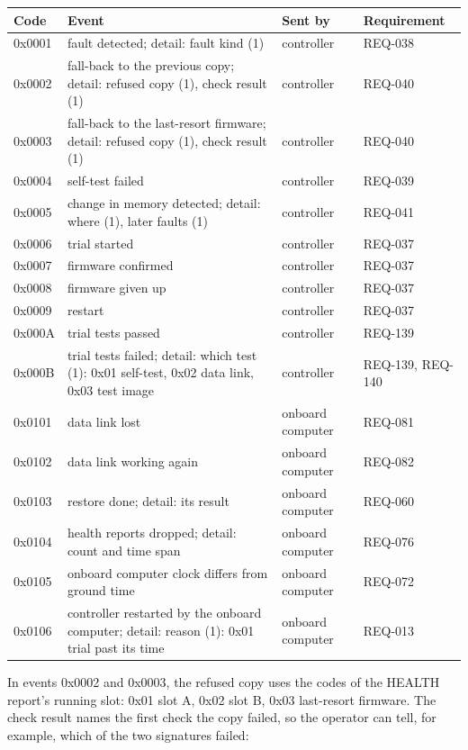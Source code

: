 \documentclass[11pt,a4paper]{article}
\begin{document}
{\footnotesize\noindent\begin{tabularx}{\textwidth}{@{}l>{\raggedright\arraybackslash}Xll@{}}
\toprule
Code & Event & Sent by & Requirement \\
\midrule
0x0001 & fault detected; detail: fault kind (1) & controller & REQ-038 \\
0x0002 & fall-back to the previous copy; detail: refused copy (1), check result (1) & controller & REQ-040 \\
0x0003 & fall-back to the last-resort firmware; detail: refused copy (1), check result (1) & controller & REQ-040 \\
0x0004 & self-test failed & controller & REQ-039 \\
0x0005 & change in memory detected; detail: where (1), later faults (1) & controller & REQ-041 \\
0x0006 & trial started & controller & REQ-037 \\
0x0007 & firmware confirmed & controller & REQ-037 \\
0x0008 & firmware given up & controller & REQ-037 \\
0x0009 & restart & controller & REQ-037 \\
0x000A & trial tests passed & controller & REQ-139 \\
0x000B & trial tests failed; detail: which test (1): 0x01 self-test, 0x02 data link, 0x03 test image & controller & REQ-139, REQ-140 \\
0x0101 & data link lost & onboard computer & REQ-081 \\
0x0102 & data link working again & onboard computer & REQ-082 \\
0x0103 & restore done; detail: its result & onboard computer & REQ-060 \\
0x0104 & health reports dropped; detail: count and time span & onboard computer & REQ-076 \\
0x0105 & onboard computer clock differs from ground time & onboard computer & REQ-072 \\
0x0106 & controller restarted by the onboard computer; detail: reason (1): 0x01 trial past its time & onboard computer & REQ-013 \\
\bottomrule
\end{tabularx}}

\medskip
\noindent In events 0x0002 and 0x0003, the refused copy uses the codes of the HEALTH
report's running slot: 0x01 slot A, 0x02 slot B, 0x03 last-resort firmware. The
check result names the first check the copy failed, so the operator can tell, for
example, which of the two signatures failed:
\end{document}
